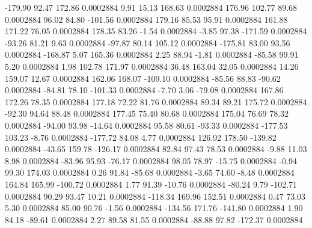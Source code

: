      -179.90       92.47      172.86     0.0002884
        9.91       15.13      168.63     0.0002884
      176.96      102.77       89.68     0.0002884
       96.02       84.80     -101.56     0.0002884
      179.16       85.53       95.91     0.0002884
      161.88      171.22       76.05     0.0002884
      178.35       83.26       -1.54     0.0002884
       -3.85       97.38     -171.59     0.0002884
      -93.26       81.21        9.63     0.0002884
      -97.87       80.14      105.12     0.0002884
     -175.81       83.00       93.56     0.0002884
     -168.87        5.07      165.36     0.0002884
        2.25       88.94       -1.81     0.0002884
      -85.58       99.91        5.20     0.0002884
        1.98      102.78      171.97     0.0002884
       36.48      163.04       32.05     0.0002884
       14.26      159.07       12.67     0.0002884
      162.06      168.07     -109.10     0.0002884
      -85.56       88.83      -90.62     0.0002884
      -84.81       78.10     -101.33     0.0002884
       -7.70        3.06      -79.08     0.0002884
      167.86      172.26       78.35     0.0002884
      177.18       72.22       81.76     0.0002884
       89.34       89.21      175.72     0.0002884
      -92.30       94.64       88.48     0.0002884
      177.45       75.40       80.68     0.0002884
      175.04       76.69       78.32     0.0002884
      -94.00       93.98      -14.64     0.0002884
       95.58       80.61      -93.33     0.0002884
     -177.53      103.23       -8.76     0.0002884
     -177.72       84.08        4.77     0.0002884
      126.92      178.50     -139.82     0.0002884
      -43.65      159.78     -126.17     0.0002884
       82.84       97.43       78.53     0.0002884
       -9.88       11.03        8.98     0.0002884
      -83.96       95.93      -76.17     0.0002884
       98.05       78.97      -15.75     0.0002884
       -0.94       99.30      174.03     0.0002884
        0.26       91.84      -85.68     0.0002884
       -3.65       74.60       -8.48     0.0002884
      164.84      165.99     -100.72     0.0002884
        1.77       91.39      -10.76     0.0002884
      -80.24        9.79     -102.71     0.0002884
       90.29       93.47       10.21     0.0002884
     -118.34      169.96      152.51     0.0002884
        0.47       73.03        5.30     0.0002884
       85.00       90.76       -1.56     0.0002884
     -134.56      171.76     -141.80     0.0002884
        1.90       84.18      -89.61     0.0002884
        2.27       89.58       81.55     0.0002884
      -88.88       97.82     -172.37     0.0002884
